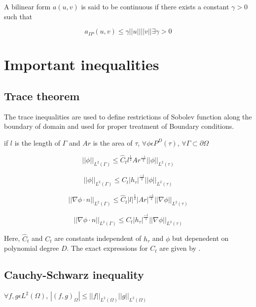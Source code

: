 \documentclass[a4paper,12pt]{book}
\begin{document}
A bilinear form $a(u,v)$ is said to be continuous if there exists a constant $\gamma > 0$ such that

\begin{equation}\label{Continuity_constant}
a_{IP}(u,v) \leq \gamma ||u||||v||   \exists   \gamma > 0
\end{equation}

\section{Important inequalities}

\subsection{Trace theorem} \cite{riviere}

The trace inequalities are used to define restrictions of Sobolev function along the boundary of domain and used for proper treatment of Boundary conditions. 

if $l$ is the length of $\Gamma$ and $Ar$ is the area of $\tau$,  $\forall \phi \epsilon P^D (\tau)$, $\forall \Gamma \subset \partial \Omega$

\begin{equation}
||\phi||_{L^2(\Gamma)} \leq \hat{C}_t l^{\frac{1}{2}} Ar^{\frac{-1}{2}} ||\phi||_{L^2(\tau)}
\end{equation}

\begin{equation}
||\phi||_{L^2(\Gamma)} \leq {C}_t |h_\tau|^{\frac{-1}{2}} ||\phi||_{L^2(\tau)}
\end{equation}

\begin{equation}
||\nabla \phi \cdot n||_{L^2(\Gamma)} \leq \hat{C}_t |l|^{\frac{1}{2}} |Ar|^{\frac{-1}{2}} ||\nabla \phi||_{L^2(\tau)}
\end{equation}

\begin{equation}
||\nabla \phi \cdot n||_{L^2(\Gamma)} \leq {C}_t |h_\tau|^{\frac{-1}{2}} ||\nabla \phi||_{L^2(\tau)}
\end{equation}

Here, $\hat{C}_t$ and ${C}_t$ are constants independent of $h_\tau$ and $\phi$ but depenedent on polynomial degree $D$. The exact expressions for $C_t$ are given by \cite{warburton}.

\subsection{Cauchy-Schwarz inequality} 
\begin{center}
$\forall f,g \epsilon L^2(\Omega)$, $|(f,g)_{\Omega}| \leq ||f||_{L^2(\Omega)} ||g||_{L^2(\Omega)}$ \\
\end{center}
\end{document}
